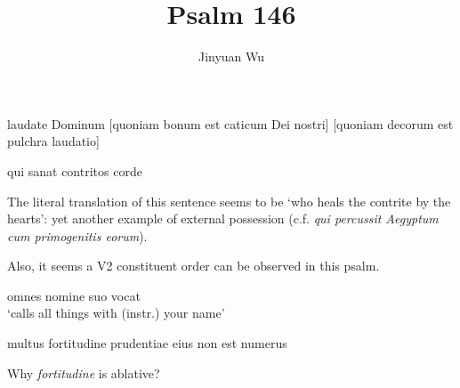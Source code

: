 \documentclass[a4paper, 12pt]{article}
\title{Psalm 146}
\author{Jinyuan Wu}
\newcommand{\form}[1]{\emph{#1}}
\newcommand{\translate}[1]{`#1'}
\begin{document}
\maketitle

\begin{exe}
    \ex laudate Dominum [quoniam bonum est caticum Dei nostri] [quoniam decorum est pulchra laudatio] 
\end{exe}

\begin{exe}
    \ex qui sanat contritos corde
\end{exe}

The literal translation of this sentence seems to be \translate{who heals the contrite by the hearts}:
yet another example of external possession
(c.f. \form{qui percussit Aegyptum cum primogenitis eorum}).

Also, it seems a V2 constituent order can be observed in this psalm.

\begin{exe}
    \ex omnes nomine suo vocat \\
    \translate{calls all things with (instr.) your name}
\end{exe}

\begin{exe}
    \ex multus fortitudine prudentiae eius non est numerus
\end{exe}
Why \form{fortitudine} is ablative?
\end{document}
